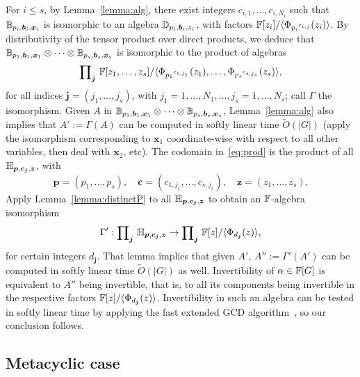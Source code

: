 For $i \le s$, by Lemma~\ref{lemma:alg}, there exist integers
$c_{i,1},\dots,c_{i,N_i}$ such that
$\mathbb{B}_{p_i,\boldsymbol{b}_i,\boldsymbol{x}_i}$ is isomorphic to an
algebra $\mathbb{D}_{p_i, \boldsymbol{b}_i, z_i}$, with factors 
$\mathbb{F}[z_i]/\langle \Phi_{{p_i}^{c_{i,j}}}(z_i) \rangle$.
By distributivity of the tensor product over direct products, we
deduce that $\mathbb{B}_{p_1,\boldsymbol{b}_1,\boldsymbol{x}_1} \otimes \cdots
\otimes \mathbb{B}_{p_s,\boldsymbol{b}_s,\boldsymbol{x}_s}$ is isomorphic to
the product of algebras
 \begin{equation}\label{eq:prod}
\text{\small $\prod$}_{\boldsymbol{j}}~ \mathbb{F}[z_1,\dots,z_s]/
\langle \Phi_{{p_1}^{c_{1,j_1}}}(z_1),\dots, \Phi_{{p_s}^{c_{s,j_s}}}(z_s) \rangle,   
 \end{equation}
for all indices $\boldsymbol{j}=(j_1,\dots,j_s)$, with
$j_1 =1,\dots,N_1,\dots,j_s=1,\dots,N_s$;
call $\Gamma$ the isomorphism. Given $A$ in $\mathbb{B}_{p_1,\boldsymbol{b}_1,\boldsymbol{x}_1} \otimes
\cdots \otimes \mathbb{B}_{p_s,\boldsymbol{b}_s,\boldsymbol{x}_s}$,
Lemma~\ref{lemma:alg} also implies that $A':=\Gamma(A)$ can be
computed in softly linear time $\tilde{O}(|G|)$ (apply the isomorphism
corresponding to $\boldsymbol{x}_1$ coordinate-wise with respect to
all other variables, then deal with $\boldsymbol{x}_2$, etc).
The codomain in~\eqref{eq:prod} is the product of all $\mathbb{H}_{\boldsymbol{p},\boldsymbol{c}_{\boldsymbol{j}},\boldsymbol{z}}$,
with 
$$\boldsymbol{p}=(p_1,\dots,p_s),\quad \boldsymbol{c}=(c_{1,j_1},\dots,c_{s,j_s}),\quad \boldsymbol{z}=(z_1,\dots,z_s).$$
Apply Lemma~\ref{lemma:distinctP} to all 
$\mathbb{H}_{\boldsymbol{p},\boldsymbol{c}_{\boldsymbol{j}},\boldsymbol{z}}$ to obtain
an $\mathbb{F}$-algebra isomorphism
$$\Gamma': \text{\small $\prod$}_{\boldsymbol{j}}~
\mathbb{H}_{\boldsymbol{p},\boldsymbol{c}_{\boldsymbol{j}},\boldsymbol{z}} \to
\text{\small $\prod$}_{\boldsymbol{j}} ~\mathbb{F}[z]/\langle
\Phi_{d_{\boldsymbol{j}}}(z) \rangle,$$ for certain integers
$d_{\boldsymbol{j}}$. That lemma implies that given $A'$,
$A'':=\Gamma'(A')$ can be computed in softly linear time
$\tilde{O}(|G|)$ as well. Invertibility of $\alpha \in \mathbb{F}[G]$ is
equivalent to $A''$ being invertible, that is, to all its components
being invertible in the respective factors $\mathbb{F}[z]/\langle
\Phi_{d_{\boldsymbol{j}}}(z) \rangle$. Invertibility in such an
algebra can be tested in softly linear time by applying the fast
extended GCD algorithm~\cite[Chapter~11]{vzGathen13}, so our conclusion follows.

\subsection{Metacyclic case}


